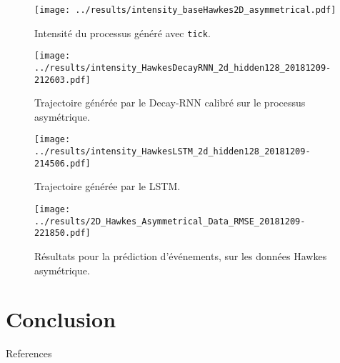 \documentclass{beamer}
\begin{document}
\begin{frame}
\begin{figure}
	\texttt{[image: ../results/intensity\_baseHawkes2D\_asymmetrical.pdf]}
	\caption{Intensité du processus généré avec \texttt{tick}.}
\end{figure}
\end{frame}

\begin{frame}
\begin{figure}
	\texttt{[image: ../results/intensity\_HawkesDecayRNN\_2d\_hidden128\_20181209-212603.pdf]}
	\caption{Trajectoire générée par le Decay-RNN calibré sur le processus asymétrique.}	
\end{figure}
\end{frame}

\begin{frame}
\begin{figure}
	\texttt{[image: ../results/intensity\_HawkesLSTM\_2d\_hidden128\_20181209-214506.pdf]}
	\caption{Trajectoire générée par le LSTM.}
\end{figure}
\end{frame}

\begin{frame}
\begin{figure}
	\texttt{[image: ../results/2D\_Hawkes\_Asymmetrical\_Data\_RMSE\_20181209-221850.pdf]}
	\caption{Résultats pour la prédiction d'événements, sur les données Hawkes asymétrique.}
\end{figure}
\end{frame}

\section{Conclusion}

\begin{frame}[t,allowframebreaks]{References}
	\printbibliography
\end{frame}
\end{document}
